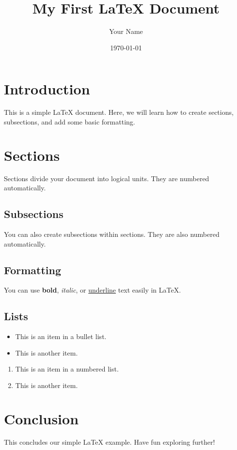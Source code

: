\documentclass{article}
\title{My First LaTeX Document}
\author{Your Name}
\date{\today}
\begin{document}
\maketitle
\section{Introduction}
This is a simple LaTeX document. Here, we will learn how to create sections, subsections, and add some basic formatting.
\section{Sections}
Sections divide your document into logical units. They are numbered automatically.
\subsection{Subsections}
You can also create subsections within sections. They are also numbered automatically.
\subsection{Formatting}
You can use \textbf{bold}, \textit{italic}, or \underline{underline} text easily in LaTeX.
\subsection{Lists}
\begin{itemize}
    \item This is an item in a bullet list.
    \item This is another item.
\end{itemize}
\begin{enumerate}
    \item This is an item in a numbered list.
    \item This is another item.
\end{enumerate}
\section{Conclusion}
This concludes our simple LaTeX example. Have fun exploring further!
\end{document}
